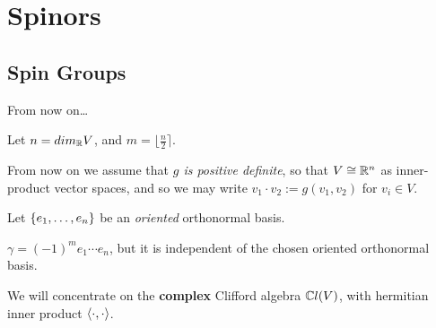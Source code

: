 \section{Spinors}

\subsection{Spin Groups}

\begin{frame}{From now on\dots} %

    Let $n = dim_\mathbb R V$, and $m = \lfloor \frac{n}{2} \rceil$.

    From now on we assume that \emph{$g$ is positive definite}, so that $V \cong \mathbb R^n$ as inner-product vector spaces, and so we may write $v_1 \cdot v_2 := g(v_1, v_2)$ for $v_i \in V$. %
    
    Let $\{e_1, \dots, e_n\}$ be an \emph{oriented} orthonormal basis.
    
    $\gamma = (-1)^m e_1 \cdots e_n$, but it is independent of the chosen oriented orthonormal basis. %

    We will concentrate on the \textbf{complex} Clifford algebra $\mathbb C l(V)$, with hermitian inner product $\langle \cdot , \cdot \rangle$.%
    
\end{frame}

